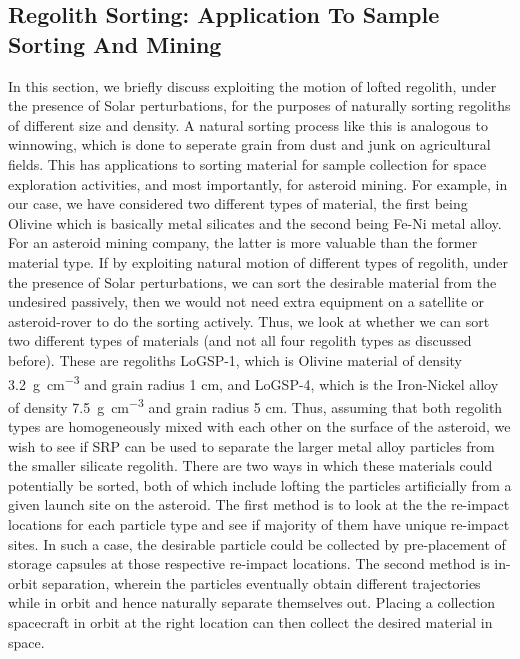 \subsection{Regolith Sorting: Application To Sample Sorting And Mining}
\label{sec:asteroid_mining}
In this section, we briefly discuss exploiting the motion of lofted regolith, under the presence of Solar perturbations, for the purposes of naturally sorting regoliths of different size and density. A natural sorting process like this is analogous to winnowing, which is done to seperate grain from dust and junk on agricultural fields. This has applications to sorting material for sample collection for space exploration activities, and most importantly, for asteroid mining. For example, in our case, we have considered two different types of material, the first being Olivine which is basically metal silicates and the second being Fe-Ni metal alloy. For an asteroid mining company, the latter is more valuable than the former material type. If by exploiting natural motion of different types of regolith, under the presence of Solar perturbations, we can sort the desirable material from the undesired passively, then we would not need extra equipment on a satellite or asteroid-rover to do the sorting actively.
%
\newline\newline
%
Thus, we look at whether we can sort two different types of materials (and not all four regolith types as discussed before). These are regoliths LoGSP-1, which is Olivine material of density \SI{3.2}{\gram\per\centi\metre\cubed} and grain radius 1 cm, and LoGSP-4, which is the Iron-Nickel alloy of density \SI{7.5}{\gram\per\centi\metre\cubed} and grain radius 5 cm. Thus, assuming that both regolith types are homogeneously mixed with each other on the surface of the asteroid, we wish to see if \gls{SRP} can be used to separate the larger metal alloy particles from the smaller silicate regolith. There are two ways in which these materials could potentially be sorted, both of which include lofting the particles artificially from a given launch site on the asteroid. The first method is to look at the the re-impact locations for each particle type and see if majority of them have unique re-impact sites. In such a case, the desirable particle could be collected by pre-placement of storage capsules at those respective re-impact locations. The second method is in-orbit separation, wherein the particles eventually obtain different trajectories while in orbit and hence naturally separate themselves out. Placing a collection spacecraft in orbit at the right location can then collect the desired material in space.
